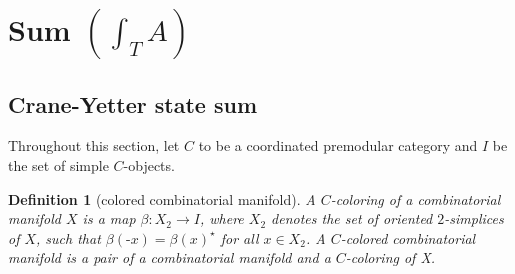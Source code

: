 \documentclass[12pt]{extarticle}
\numberwithin{equation}{section} %
\theoremstyle{mystyle}
\newtheorem{definition}[equation]{Definition}
\begin{document}
\section{Sum $\left( \int_{T}{A} \right)$}\label{section/sum}
\subsection{Crane-Yetter state sum}

\noindent Throughout this section, let $C$ to be a coordinated
premodular category and $I$ be the set of simple $C$-objects.



\begin{definition}[colored combinatorial manifold]
  A $C$-coloring of a combinatorial manifold $X$ is a map
  $\beta: X_{2} \to I$, where $X_{2}$ denotes the set of oriented
  $2$-simplices of $X$, such that
  $\beta(\text{-}x) = \beta(x)^{\star}$ for all $x \in X_{2}$. A
  $C$-colored combinatorial manifold is a pair of a combinatorial
  manifold and a $C$-coloring of X.
\end{definition}
\end{document}
